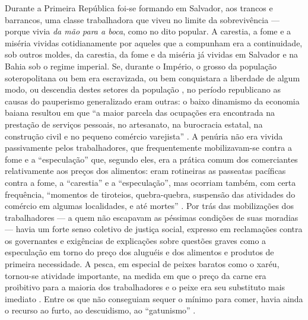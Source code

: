 Durante a Primeira República foi-se formando em Salvador, aos trancos e barrancos, uma classe trabalhadora que viveu no limite da sobrevivência --- porque vivia \textit{da mão para a boca}, como no dito popular. A carestia, a fome e a miséria vividas cotidianamente por aqueles que a compunham era a continuidade, sob outros moldes, da carestia, da fome e da miséria já vividas em Salvador e na Bahia sob o regime imperial. Se, durante o Império, o grosso da população soteropolitana ou bem era escravizada, ou bem conquistara a liberdade de algum modo, ou descendia destes setores da população \cite{fraga_mendigos_1996}, no período republicano as causas do pauperismo generalizado eram outras: o baixo dinamismo da economia baiana resultou em que ``a maior parcela das ocupações era encontrada na prestação de serviços pessoais, no artesanato, na burocracia estatal, na construção civil e no pequeno comércio varejista'' \cite[p.~17]{almeida_ecossa_2008}. A penúria não era vivida passivamente pelos trabalhadores, que frequentemente mobilizavam-se contra a fome e a ``especulação'' que, segundo eles, era a prática comum dos comerciantes relativamente aos preços dos alimentos: eram rotineiras as passeatas pacíficas contra a fome, a ``carestia'' e a ``especulação'', mas ocorriam também, com certa frequência, ``momentos de tiroteios, quebra-quebra, suspensão das atividades do comércio em algumas localidades, e até mortes'' \cite[p.~73-75]{celestino_cosmedefarias_2005}. Por trás das mobilizações dos trabalhadores --- a quem não escapavam as péssimas condições de suas moradias --- havia um forte senso coletivo de justiça social, expresso em reclamações contra os governantes e exigências de explicações sobre questões graves como a especulação em torno do preço dos aluguéis e dos alimentos e produtos de primeira necessidade. A pesca, em especial de peixes baratos como o xaréu, tornou-se atividade importante, na medida em que o preço da carne era proibitivo para a maioria dos trabalhadores e o peixe era seu substituto mais imediato \cite[p.~8, 12]{souza_fomerepublicassa_2019}. Entre os que não conseguiam sequer o mínimo para comer, havia ainda o recurso ao furto, ao descuidismo, ao ``gatunismo'' \cite[p.~154]{silva_gatunismo_2018}.

